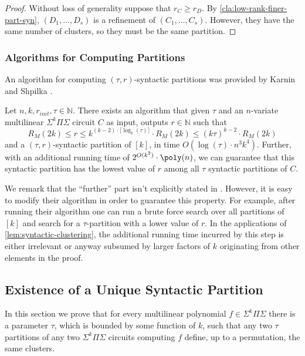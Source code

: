 \documentclass[12pt]{article}
\newcommand{\N}{\mathbb{N}}
\newcommand{\Sps}[1]{\Sigma^{#1} \Pi\Sigma}
\begin{document}
	\begin{proof}
		Without loss of generality suppose that $r_C \ge r_D$. By \autoref{cla:low-rank-finer-part-syn}, $(D_1, \ldots, D_s)$ is a refinement of $(C_1, \ldots, C_s)$. However, they have the same number of clusters, so they must be the same partition.
	\end{proof}
	
	
	
	\subsubsection{Algorithms for Computing Partitions}
	
	
	An algorithm for computing $(\tau,r)$-syntactic partitions was provided by Karnin and Shpilka \cite{KarninShpilka09}.
	
	\sloppy
	\begin{lemma}
		\label{lem:syntactic-clustering}
		Let  $n,k, r_{init}, \tau \in \N$.
		There exists an algorithm that given $\tau$ and an $n$-variate multilinear $\Sps{k}$ circuit $C$ as input, outputs $r \in \N$ such that 
		\[R_M(2k) \leq r \leq k^{(k-2) \cdot \lceil \log_k(\tau)\rceil} \cdot R_M(2k)\leq  (k\tau)^{k-2} \cdot R_M(2k)
		\]
		and a $(\tau, r)$-syntactic partition of $[k]$, in time $O(\log(\tau) \cdot n^3k^4).$ Further, with an additional running time of $2^{O(k^2)} \cdot \poly(n)$, we can guarantee that this syntactic partition has the lowest value of $r$ among all $\tau$ syntactic partitions of $C$.
	\end{lemma}
	We remark that the ``further'' part isn't explicitly stated in \cite{KarninShpilka09}. However, it is easy to modify their algorithm in order to guarantee this property. For example, after running their algorithm one can run a brute force search over all partitions of $[k]$ and search for a $\tau$-partition with a lower value of $r$. In the applications of \autoref{lem:syntactic-clustering}, the additional running time incurred by this step is either irrelevant or anyway subsumed by larger factors of $k$ originating from other elements in the proof.
	
	
	\subsection{Existence of a Unique Syntactic Partition}
	
	In this section we prove that for every multilinear polynomial $f\in\Sps{k}$ there is a parameter $\tau$, which is bounded by some function of $k$, such that any two $\tau$ partitions of any two $\Sps{k}$ circuits computing $f$ define, up to a permutation, the same clusters.
	
\end{document}
